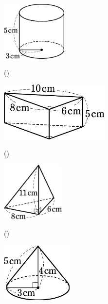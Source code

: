 \documentclass[
  12pt,a4paper,lualatex,ja=standard]{bxjsarticle}
\begin{document}
\begin{flushleft}
\begin{multicols}{3}
\begin{center}
\def\@captype{figure}
\includegraphics[height=30mm]{img/img8.jpg}

\end{center}

\columnbreak

()\hspace{2.5pt}

\begin{center}
\def\@captype{figure}
\includegraphics[height=30mm]{img/img9.jpg}

\end{center}

\end{multicols}

\vfill

\begin{multicols}{3}

()\hspace{2.5pt}

\begin{center}
\def\@captype{figure}
\includegraphics[height=30mm]{img/img10.jpg}

\end{center}

\columnbreak

()\hspace{2.5pt}

\begin{center}
\def\@captype{figure}
\includegraphics[height=30mm]{img/img14.jpg}


\end{center}
\end{multicols}
\end{flushleft}
\end{document}
